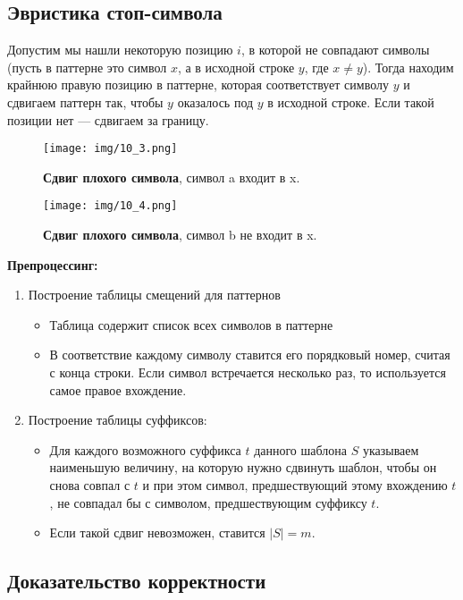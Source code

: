 \subsection{Эвристика стоп-символа}

Допустим мы нашли некоторую позицию $i$, в которой не совпадают символы (пусть в паттерне это символ $x$, а в исходной строке $y$, где $x \ne y$). 
Тогда находим крайнюю правую позицию в паттерне, которая соответствует символу $y$ и сдвигаем паттерн так, чтобы $y$ оказалось под $y$ в исходной строке. Если такой позиции нет --- сдвигаем за границу.


\begin{figure}[h!]
	\centering
	\texttt{[image: img/10\_3.png]}
	\captionsetup{labelformat=empty}
	\caption{\textbf{Сдвиг плохого символа}, символ a входит в x.}
\end{figure}

\begin{figure}[h!]
	\centering
	\texttt{[image: img/10\_4.png]}
	\captionsetup{labelformat=empty}
	\caption{\textbf{Сдвиг плохого символа}, символ b не входит в x.}
\end{figure}


\textbf{Препроцессинг:}
\begin{enumerate}
	\item Построение таблицы смещений для паттернов
	\begin{itemize}
		\item Таблица содержит список всех символов в паттерне
		\item В соответствие каждому символу ставится его порядковый номер, считая с конца строки. Если символ встречается несколько раз, то используется самое правое вхождение.
	\end{itemize}
	\item Построение таблицы суффиксов:
	\begin{itemize}
		\item Для каждого возможного суффикса $t$ данного шаблона $S$ указываем наименьшую величину, на которую нужно сдвинуть шаблон, чтобы он снова совпал с $t$ и при этом символ, предшествующий этому вхождению $t$, не совпадал бы с символом, предшествующим суффиксу $t$.
		\item Если такой сдвиг невозможен, ставится $|S|=m$.
	\end{itemize}
\end{enumerate}


\subsection*{Доказательство корректности}

